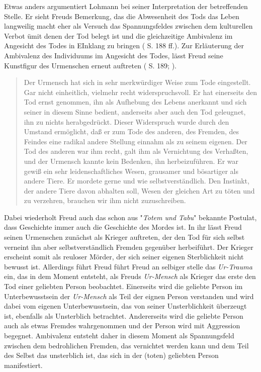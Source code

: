 \documentclass[11pt,a4paper,oneside,numbers=noenddot,bibliography=totocnumbered,DIV=13]{scrartcl}
\begin{document}
{Etwas anders argumentiert Lohmann bei seiner Interpretation der betreffenden Stelle. Er sieht Freuds Bemerkung, das die Abwesenheit des Tods das Leben langweilig macht eher als Versuch das Spannungsfeldes zwischen dem kulturellen Verbot ümit denen der Tod belegt ist und die gleichzeitige Ambivalenz im Angesicht des Todes in EInklang zu bringen (\cite{lohmann_freud-handbuch:_2013} S. 188 ff.).
Zur Erläuterung der Ambivalenz des Individuums im Angesicht des Todes, lässt Freud seine Kunstfigur des Urmenschen erneut auftreten (\cite{lohmann_freud-handbuch:_2013} S. 189; 
). 
\begin{quote}
\glqq Der Urmensch hat sich in sehr merkwürdiger Weise zum Tode eingestellt. Gar nicht einheitlich, vielmehr recht widerspruchsvoll. Er hat einerseits den Tod ernst genommen, ihn als Aufhebung des Lebens anerkannt und sich seiner in diesem Sinne bedient, anderseits aber auch den Tod geleugnet, ihn zu nichts herabgedrückt. Dieser Widerspruch wurde durch den Umstand ermöglicht, daß er zum Tode des anderen, des Fremden, des Feindes eine radikal andere Stellung einnahm als zu seinem eigenen. Der Tod des anderen war ihm recht, galt ihm als Vernichtung des Verhaßten, und der Urmensch kannte kein Bedenken, ihn herbeizuführen. Er war gewiß ein sehr leidenschaftliches Wesen, grausamer und bösartiger als andere Tiere. Er mordete gerne und wie selbstverständlich. Den Instinkt, der andere Tiere davon abhalten soll, Wesen der gleichen Art zu töten und zu verzehren, brauchen wir ihm nicht zuzuschreiben.\grqq
\end{quote}
Dabei wiederholt Freud auch das schon aus "\textit{Totem und Tabu}" bekannte Postulat, dass Geschichte immer auch die Geschichte des Mordes ist. In ihr lässt Freud seinen Urmenschen zunächst als Krieger auftreten, der den Tod für sich selbst verneint ihn aber selbstverständlich Fremden gegenüber herbeiführt. Der Krieger erscheint somit als reuloser Mörder, der sich seiner eigenen Sterblichkeit nicht bewusst ist. 
Allerdings führt Freud führt Freud an selbiger stelle das \textit{Ur-Trauma} ein, das in dem Moment entsteht, als Freuds \textit{Ur-Mensch} als Krieger das erste den Tod einer geliebten Person beobachtet. Einerseits wird die geliebte Person im Unterbewusstsein der \textit{Ur-Mensch} als Teil der eignen Person verstanden und wird dabei vom eigenen Unterbewusstsein, das von seiner Unsterblichkeit überzeugt ist, ebenfalls als Unsterblich betrachtet. Andererseits wird die geliebte Person auch als etwas Fremdes wahrgenommen und der Person wird mit Aggression begegnet. Ambivalenz entsteht daher in diesem Moment als Spannungsfeld zwischen dem bedrohlichen Fremden, das vernichtet werden kann und dem Teil des Selbst das unsterblich ist, das sich in der (toten) geliebten Person manifestiert.
}
\end{document}
